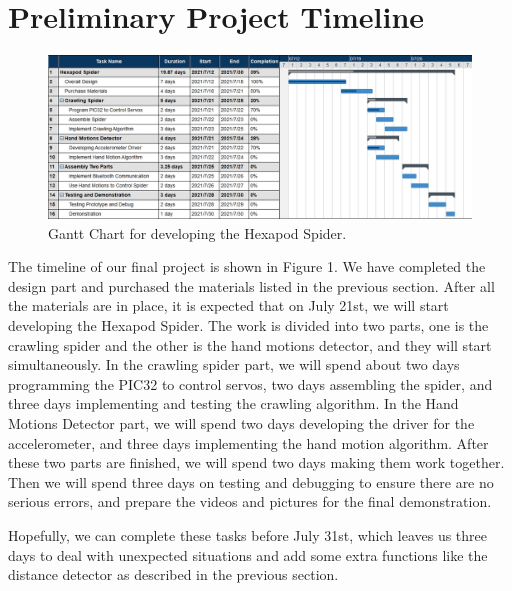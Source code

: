 \documentclass[a4paper]{article}
\begin{document}
\section{Preliminary Project Timeline}
\begin{figure}[H]
    \centering
    \includegraphics[width=1\textwidth]{Hexapod Spider.jpg}
    \caption{Gantt Chart for developing the Hexapod Spider.}
\end{figure}

The timeline of our final project is shown in Figure 1. We have completed the design part and purchased the materials listed in the previous section. After all the materials are in place, it is expected that on July 21st, we will start developing the Hexapod Spider. The work is divided into two parts, one is the crawling spider and the other is the hand motions detector, and they will start simultaneously. In the crawling spider part, we will spend about two days programming the PIC32 to control servos, two days assembling the spider, and three days implementing and testing the crawling algorithm. In the Hand Motions Detector part, we will spend two days developing the driver for the accelerometer, and three days implementing the hand motion algorithm. After these two parts are finished, we will spend two days making them work together. Then we will spend three days on testing and debugging to ensure there are no serious errors, and prepare the videos and pictures for the final demonstration. 

Hopefully, we can complete these tasks before July 31st, which leaves us three days to deal with unexpected situations and add some extra functions like the distance detector as described in the previous section.
\end{document}
